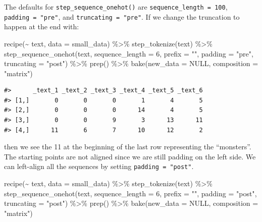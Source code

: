 \documentclass[
]{krantz}
\makeatletter
\newenvironment{Shaded}{\begin{snugshade}}{\end{snugshade}}
\newcommand{\AttributeTok}[1]{\textcolor[rgb]{0.77,0.63,0.00}{#1}}
\newcommand{\ConstantTok}[1]{\textcolor[rgb]{0.00,0.00,0.00}{#1}}
\newcommand{\DecValTok}[1]{\textcolor[rgb]{0.00,0.00,0.81}{#1}}
\newcommand{\FunctionTok}[1]{\textcolor[rgb]{0.00,0.00,0.00}{#1}}
\newcommand{\NormalTok}[1]{#1}
\newcommand{\SpecialCharTok}[1]{\textcolor[rgb]{0.00,0.00,0.00}{#1}}
\newcommand{\StringTok}[1]{\textcolor[rgb]{0.31,0.60,0.02}{#1}}
\newenvironment{kframe}{%
\medskip{}
\setlength{\fboxsep}{.8em}
 \def\at@end@of@kframe{}%
 \ifinner\ifhmode%
  \def\at@end@of@kframe{\end{minipage}}%
  \begin{minipage}{\columnwidth}%
 \fi\fi%
 \def\FrameCommand##1{\hskip\@totalleftmargin \hskip-\fboxsep
 \colorbox{shadecolor}{##1}\hskip-\fboxsep
     \hskip-\linewidth \hskip-\@totalleftmargin \hskip\columnwidth}%
 \MakeFramed {\advance\hsize-\width
   \@totalleftmargin\z@ \linewidth\hsize
   \@setminipage}}%
 {\par\unskip\endMakeFramed%
 \at@end@of@kframe}
\renewenvironment{Shaded}{\begin{kframe}}{\end{kframe}}
\makeatother
\begin{document}
The defaults for \texttt{step\_sequence\_onehot()} are \texttt{sequence\_length\ =\ 100}, \texttt{padding\ =\ "pre"}, and \texttt{truncating\ =\ "pre"}. If we change the truncation to happen at the end with:

\begin{Shaded}
\begin{Highlighting}[]
\FunctionTok{recipe}\NormalTok{(}\SpecialCharTok{\textasciitilde{}}\NormalTok{ text, }\AttributeTok{data =}\NormalTok{ small\_data) }\SpecialCharTok{\%\textgreater{}\%}
  \FunctionTok{step\_tokenize}\NormalTok{(text) }\SpecialCharTok{\%\textgreater{}\%}
  \FunctionTok{step\_sequence\_onehot}\NormalTok{(text, }\AttributeTok{sequence\_length =} \DecValTok{6}\NormalTok{, }\AttributeTok{prefix =} \StringTok{""}\NormalTok{,}
                       \AttributeTok{padding =} \StringTok{"pre"}\NormalTok{, }\AttributeTok{truncating =} \StringTok{"post"}\NormalTok{) }\SpecialCharTok{\%\textgreater{}\%}
  \FunctionTok{prep}\NormalTok{() }\SpecialCharTok{\%\textgreater{}\%}
  \FunctionTok{bake}\NormalTok{(}\AttributeTok{new\_data =} \ConstantTok{NULL}\NormalTok{, }\AttributeTok{composition =} \StringTok{"matrix"}\NormalTok{)}
\end{Highlighting}
\end{Shaded}

\begin{verbatim}
#>      _text_1 _text_2 _text_3 _text_4 _text_5 _text_6
#> [1,]       0       0       0       1       4       5
#> [2,]       0       0       0      14       4       5
#> [3,]       0       0       9       3      13      11
#> [4,]      11       6       7      10      12       2
\end{verbatim}

then we see the 11 at the beginning of the last row representing the ``monsters''. The starting points are not aligned since we are still padding on the left side. We can left-align all the sequences by setting \texttt{padding\ =\ "post"}.

\begin{Shaded}
\begin{Highlighting}[]
\FunctionTok{recipe}\NormalTok{(}\SpecialCharTok{\textasciitilde{}}\NormalTok{ text, }\AttributeTok{data =}\NormalTok{ small\_data) }\SpecialCharTok{\%\textgreater{}\%}
  \FunctionTok{step\_tokenize}\NormalTok{(text) }\SpecialCharTok{\%\textgreater{}\%}
  \FunctionTok{step\_sequence\_onehot}\NormalTok{(text, }\AttributeTok{sequence\_length =} \DecValTok{6}\NormalTok{, }\AttributeTok{prefix =} \StringTok{""}\NormalTok{,}
                       \AttributeTok{padding =} \StringTok{"post"}\NormalTok{, }\AttributeTok{truncating =} \StringTok{"post"}\NormalTok{) }\SpecialCharTok{\%\textgreater{}\%}
  \FunctionTok{prep}\NormalTok{() }\SpecialCharTok{\%\textgreater{}\%}
  \FunctionTok{bake}\NormalTok{(}\AttributeTok{new\_data =} \ConstantTok{NULL}\NormalTok{, }\AttributeTok{composition =} \StringTok{"matrix"}\NormalTok{)}
\end{Highlighting}
\end{Shaded}
\end{document}
